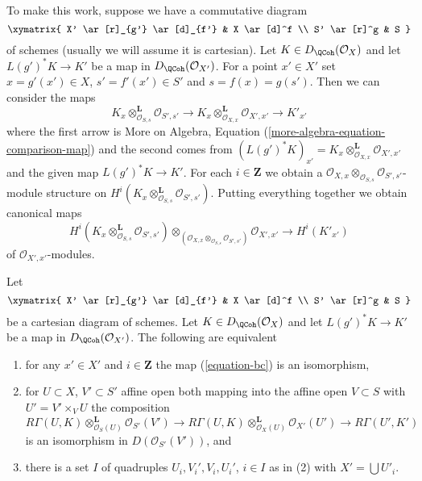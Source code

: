 \medskip\noindent
To make this work, suppose we have a commutative diagram
$$
\xymatrix{
X' \ar[r]_{g'} \ar[d]_{f'} &
X \ar[d]^f \\
S' \ar[r]^g &
S
}
$$
of schemes (usually we will assume it is cartesian).
Let $K \in D_\QCoh(\mathcal{O}_X)$
and let $L(g')^*K \to K'$ be a map in $D_\QCoh(\mathcal{O}_{X'})$.
For a point $x' \in X'$ set $x = g'(x') \in X$,
$s' = f'(x') \in S'$ and $s = f(x) = g(s')$.
Then we can consider the maps
$$
K_x \otimes_{\mathcal{O}_{S, s}}^\mathbf{L} \mathcal{O}_{S', s'} \to
K_x \otimes_{\mathcal{O}_{X, x}}^\mathbf{L} \mathcal{O}_{X', x'} \to
K'_{x'}
$$
where the first arrow is More on Algebra,
Equation (\ref{more-algebra-equation-comparison-map})
and the second comes from
$(L(g')^*K)_{x'} =
K_x \otimes_{\mathcal{O}_{X, x}}^\mathbf{L} \mathcal{O}_{X', x'}$
and the given map $L(g')^*K \to K'$.
For each $i \in \mathbf{Z}$ we obtain a
$\mathcal{O}_{X, x} \otimes_{\mathcal{O}_{S, s}} \mathcal{O}_{S', s'}$-module
structure on
$H^i(K_x \otimes_{\mathcal{O}_{S, s}}^\mathbf{L} \mathcal{O}_{S', s'})$.
Putting everything together we obtain canonical maps
\begin{equation}
\label{equation-bc}
H^i(K_x \otimes_{\mathcal{O}_{S, s}}^\mathbf{L} \mathcal{O}_{S', s'})
\otimes_{(\mathcal{O}_{X, x} \otimes_{\mathcal{O}_{S, s}} \mathcal{O}_{S', s'})}
\mathcal{O}_{X', x'}
\longrightarrow
H^i(K'_{x'})
\end{equation}
of $\mathcal{O}_{X', x'}$-modules.

\begin{lemma}
\label{lemma-single-complex-base-change-condition}
Let
$$
\xymatrix{
X' \ar[r]_{g'} \ar[d]_{f'} &
X \ar[d]^f \\
S' \ar[r]^g &
S
}
$$
be a cartesian diagram of schemes. Let $K \in D_\QCoh(\mathcal{O}_X)$
and let $L(g')^*K \to K'$ be a map in $D_\QCoh(\mathcal{O}_{X'})$.
The following are equivalent
\begin{enumerate}
\item for any $x' \in X'$ and $i \in \mathbf{Z}$ the map (\ref{equation-bc})
is an isomorphism,
\item for $U \subset X$, $V' \subset S'$ affine open both mapping
into the affine open $V \subset S$ with $U' = V' \times_V U$
the composition
$$
R\Gamma(U, K) \otimes_{\mathcal{O}_S(U)}^\mathbf{L} \mathcal{O}_{S'}(V')
\to
R\Gamma(U, K) \otimes_{\mathcal{O}_X(U)}^\mathbf{L} \mathcal{O}_{X'}(U')
\to
R\Gamma(U', K')
$$
is an isomorphism in $D(\mathcal{O}_{S'}(V'))$, and
\item there is a set $I$ of quadruples $U_i, V_i', V_i, U_i'$, $i \in I$
as in (2) with $X' = \bigcup U'_i$.
\end{enumerate}
\end{lemma}


